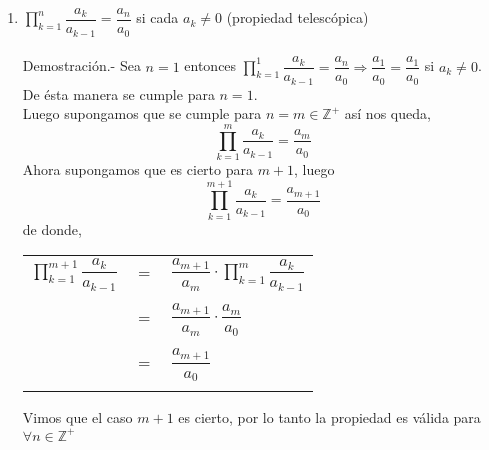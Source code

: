 \begin{enumerate}
\item $\displaystyle\prod_{k=1}^n \dfrac{a_k}{a_{k-1}} = \dfrac{a_n}{a_0}$ si cada $a_k\neq 0$ (propiedad telescópica)\\\\
Demostración.- \; Sea $n=1$ entonces $\prod\limits_{k=1}^1 \dfrac{a_k}{a_{k-1}} = \dfrac{a_n}{a_0} \Rightarrow \dfrac{a_1}{a_0} = \dfrac{a_1}{a_0}$ si $a_k \neq 0$. De ésta manera se cumple para $n=1$.\\
Luego supongamos que se cumple para $n = m \in \mathbb{Z}^+ $ así nos queda, $$\prod\limits_{k=1}^m \dfrac{a_k}{a_{k-1}} = \dfrac{a_m}{a_0}$$
Ahora supongamos que es cierto para $m+1$, luego $$\prod\limits_{k=1}^{m+1} \dfrac{a_k}{a_{k-1}} = \dfrac{a_{m+1}}{a_0}$$ de donde,\\
\begin{center}
\begin{tabular}{rcl}
$\prod\limits_{k=1}^{m+1} \dfrac{a_k}{a_{k-1}}$&$=$&$\dfrac{a_{m+1}}{a_m} \cdot \prod\limits_{k=1}^{m} \dfrac{a_k}{a_{k-1}}$\\\\
&$=$&$\dfrac{a_{m+1}}{a_m} \cdot \dfrac{a_m}{a_0}$\\\\
&$=$&$\dfrac{a_{m+1}}{a_0}$\\\\
\end{tabular}
\end{center}
Vimos que el caso $m+1$ es cierto, por lo tanto la propiedad es válida para $\forall n \in \mathbb{Z}^+$\\\\


\end{enumerate}
